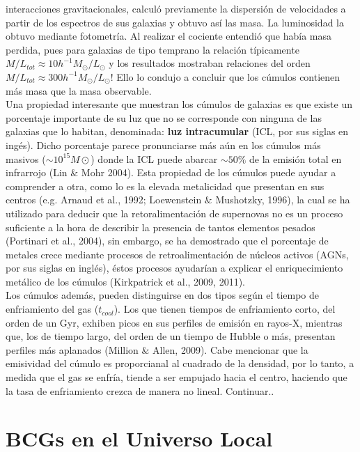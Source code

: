 interacciones gravitacionales,
calcul\'o previamente la dispersi\'on de velocidades a partir de
los espectros de sus galaxias y obtuvo as\'i las masa. La luminosidad la obtuvo
mediante fotometr\'ia. Al realizar el cociente entendi\'o que hab\'ia masa perdida, pues
para galaxias de tipo temprano la relaci\'on t\'ipicamente $M /L_{tot}\approx 10h^{-1}M_{\odot}/L_{\odot}$ y los resultados mostraban relaciones
del orden $M/L_{tot}\approx 300h^{-1}M_{\odot}/L_{\odot}$! Ello 
lo condujo a concluir que los c\'umulos contienen m\'as masa que la masa observable.\\
Una propiedad interesante que muestran los c\'umulos de galaxias  
es que existe un porcentaje importante de su luz que 
no se corresponde con ninguna de las galaxias
que lo habitan, denominada: {\bf luz intracumular} (ICL, por sus siglas en ing\'es).
Dicho porcentaje parece pronunciarse m\'as a\'un en los c\'umulos m\'as masivos ($\sim 10^{15} M\odot$)
donde la ICL puede abarcar $\sim50\%$ de la emisi\'on total en infrarrojo
(Lin  $\&$ Mohr 2004).
Esta propiedad de los c\'umulos puede ayudar a comprender
a otra, como lo es la elevada metalicidad 
que presentan en sus centros 
(e.g. Arnaud et al., 1992; Loewenstein  $\&$ Mushotzky, 1996), la cual se ha utilizado
para deducir que la retoralimentaci\'on de supernovas no es un proceso suficiente
a la hora de describir la presencia de tantos elementos pesados (Portinari et al.,
2004), sin embargo, se ha demostrado que el porcentaje
de metales crece mediante procesos de retroalimentaci\'on de n\'ucleos activos (AGNs, por sus
siglas en ingl\'es), \'estos procesos ayudar\'ian 
a explicar el enriquecimiento met\'alico de los c\'umulos (Kirkpatrick et al., 2009, 2011).\\
Los c\'umulos adem\'as, pueden distinguirse en dos tipos seg\'un el tiempo de enfriamiento del gas
($t_{cool}$). Los que tienen tiempos de enfriamiento corto, del orden de un Gyr,
exhiben picos en sus perfiles de emisi\'on en rayos-X, mientras
que, los de tiempo largo, del orden de un tiempo de Hubble o m\'as,
presentan perfiles m\'as aplanados (Million $\&$ Allen, 2009). 
Cabe mencionar que la emisividad del c\'umulo es proporcianal al cuadrado de la densidad, por lo tanto,
a medida que el gas se enfr\'ia,
tiende a ser empujado hacia el centro, haciendo que la tasa de enfriamiento crezca de manera no lineal.
Continuar..


\section{BCGs en el Universo Local}

